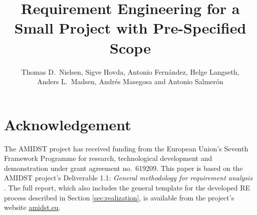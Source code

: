 \documentclass[ukenglish]{nik}
\title{Requirement Engineering for a Small Project with Pre-Specified Scope}
\author{Thomas D.\ Nielsen, Sigve Hovda, Antonio Fern\'andez, Helge Langseth, \\
Anders L.\ Madsen, Andr\'es Masegosa and  Antonio Salmer\'on }
\begin{document}
\maketitle

\begin{abstract}

\end{abstract}




 






\section*{Acknowledgement}
The AMIDST project has received funding from the European Union's Seventh
Framework Programme for research, technological development and
demonstration under grant agreement no.\ 619209.
This paper is based on the AMIDST project's Deliverable 1.1:  \emph{General methodology for
  requirement analysis}  \cite{Fer14}. The full report, which also includes the general template for the developed RE process described in Section \ref{sec:realization},
 is available from the project's website \url{amidst.eu}.



\end{document}
